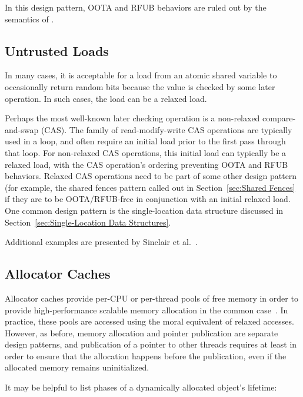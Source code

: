 \documentclass[10]{article}
\begin{document}
In this design pattern, OOTA and RFUB behaviors are ruled out by the semantics
of .

\subsection{Untrusted Loads}
\label{sec:Untrusted Loads}

In many cases, it is acceptable for a load from an atomic shared variable
to occasionally return random bits because the value is checked by
some later operation.
In such cases, the load can be a relaxed load.

Perhaps the most well-known later checking operation is a non-relaxed
compare-and-swap (CAS).
The  family of read-modify-write
CAS operations are typically used in a loop, and often require an initial
load prior to the first pass through that loop.
For non-relaxed CAS operations, this initial load can typically be a
relaxed load, with the CAS operation's ordering preventing OOTA and RFUB
behaviors.
Relaxed CAS operations need to be part of some other design pattern
(for example, the shared fences pattern called out in
Section~\ref{sec:Shared Fences}
if they are to be OOTA/RFUB-free in conjunction with an initial relaxed
load.
One common design pattern is the single-location data structure discussed in
Section~\ref{sec:Single-Location Data Structures}.

Additional examples are presented by
Sinclair et al.~\cite{Sinclair:2017:CAR:3079856.3080206}.

\subsection{Allocator Caches}
\label{sec:Allocator Caches}

Allocator caches provide per-CPU or per-thread pools of free memory
in order to provide high-performance scalable memory allocation in
the common case~\cite{McKenney93}.
In practice, these pools are accessed using the moral equivalent of
relaxed accesses.
However, as before, memory allocation and pointer publication are separate
design patterns, and publication of a pointer to other threads
requires at least  in order to ensure that
the allocation happens before the publication, even if the allocated
memory remains uninitialized.

It may be helpful to list phases of a dynamically allocated object's
lifetime:
\end{document}
